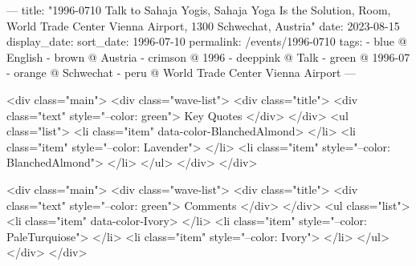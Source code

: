 ---
title: "1996-0710 Talk to Sahaja Yogis, Sahaja Yoga Is the Solution, Room, World Trade Center Vienna Airport, 1300 Schwechat, Austria"
date: 2023-08-15
display_date: 
sort_date: 1996-07-10
permalink: /events/1996-0710
tags:
  - blue @ English
  - brown @ Austria
  - crimson @ 1996
  - deeppink @ Talk
  - green @ 1996-07
  - orange @ Schwechat
  - peru @  World Trade Center Vienna Airport
---

<div class="main">
  <div class="wave-list">
    <div class="title">
      <div class="text" style="--color: green">
        Key Quotes
      </div>
    </div>
    <ul class="list">
        <li class="item" data-color-BlanchedAlmond>
        </li>
        <li class="item" style="--color: Lavender">
        </li>
        <li class="item" style="--color: BlanchedAlmond">
        </li>
      </ul>
  </div>
</div>

<div class="main">
  <div class="wave-list">
    <div class="title">
      <div class="text" style="--color: green">
        Comments
      </div>
    </div>
    <ul class="list">
        <li class="item" data-color-Ivory>
        </li>
        <li class="item" style="--color: PaleTurquiose">
        </li>
        <li class="item" style="--color: Ivory">
        </li>
      </ul>
  </div>
</div>